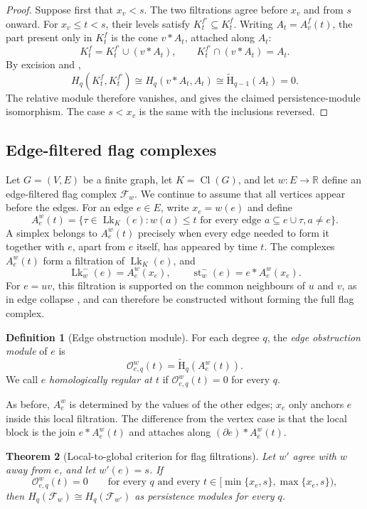 \documentclass[11pt,letterpaper]{article}
\newtheorem{theorem}{Theorem}[section]
\theoremstyle{definition}
\newtheorem{definition}[theorem]{Definition}
\newcommand{\redH}{\widetilde{\mathrm H}}
\newcommand{\lk}{\operatorname{Lk}}
\newcommand{\cl}{\operatorname{Cl}}
\newcommand{\Oc}{\mathcal O}
\begin{document}
\begin{proof}
Suppose first that $x_v<s$. The two filtrations agree before $x_v$ and from
$s$ onward. For $x_v\leq t<s$, their levels satisfy
$K_t^{f'}\subseteq K_t^f$. Writing $A_t=A_v^f(t)$, the part present only in
$K_t^f$ is the cone $v*A_t$, attached along $A_t$:
$$
K_t^f=K_t^{f'}\cup(v*A_t),
\qquad
K_t^{f'}\cap(v*A_t)=A_t.
$$
By excision and ,
$$
H_q(K_t^f,K_t^{f'})
\cong H_q(v*A_t,A_t)
\cong\redH_{q-1}(A_t)=0.
$$
The relative module therefore vanishes, and
 gives the claimed persistence-module
isomorphism. The case $s<x_v$ is the same with the inclusions reversed.
\end{proof}

\subsection{Edge-filtered flag complexes}

Let $G=(V,E)$ be a finite graph, let $K=\cl(G)$, and let
$w:E\to\mathbb R$ define an edge-filtered flag complex $\mathcal F_w$. We
continue to assume that all vertices appear before the edges. For an edge
$e\in E$, write $x_e=w(e)$ and define
$$
A_e^w(t)
=\{\tau\in\lk_K(e):w(a)\leq t
  \text{ for every edge }a\subseteq e\cup\tau, a\neq e\}.
$$
A simplex belongs to $A_e^w(t)$ precisely when every edge needed to form it
together with $e$, apart from $e$ itself, has appeared by time $t$. The
complexes $A_e^w(t)$ form a filtration of $\lk_K(e)$, and
$$
\lk_w^-(e)=A_e^w(x_e),
\qquad
\operatorname{st}_w^-(e)=e*A_e^w(x_e).
$$
For $e=uv$, this filtration is supported on the common neighbours of $u$ and
$v$, as in edge collapse \cite{BoissonnatPritam2020}, and can therefore be
constructed without forming the full flag complex.

\begin{definition}[Edge obstruction module]
\label{def:edge-obstruction}
For each degree $q$, the \emph{edge obstruction module} of $e$ is
$$
\Oc_{e,q}^w(t)=\redH_q(A_e^w(t)).
$$
We call $e$ \emph{homologically regular at $t$} if
$\Oc_{e,q}^w(t)=0$ for every $q$.
\end{definition}

As before, $A_e^w$ is determined by the values of the other edges; $x_e$ only
anchors $e$ inside this local filtration. The difference from the vertex case
is that the local block is the join $e*A_e^w(t)$ and attaches along
$(\partial e)*A_e^w(t)$.

\begin{theorem}[Local-to-global criterion for flag filtrations]
\label{thm:flag-local-global}
Let $w'$ agree with $w$ away from $e$, and let $w'(e)=s$. If
$$
\Oc_{e,q}^w(t)=0
\qquad
\text{for every $q$ and every }
t\in[\min\{x_e,s\},\max\{x_e,s\}),
$$
then $H_q(\mathcal F_w)\cong H_q(\mathcal F_{w'})$ as persistence modules
for every $q$.
\end{theorem}
\end{document}
